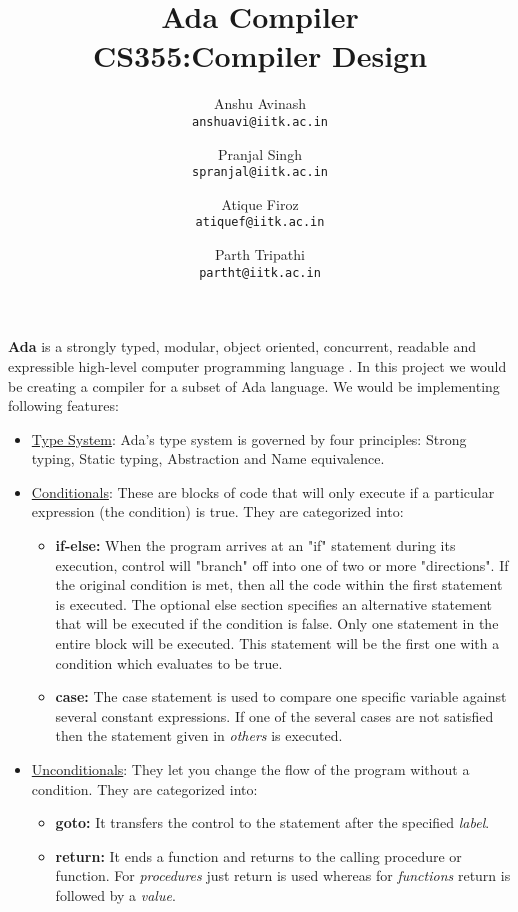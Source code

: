 \documentclass{article}
\title{
Ada Compiler \\
CS355:Compiler Design
}
\author{
Anshu Avinash\\
\texttt{anshuavi@iitk.ac.in}
\and
Pranjal Singh\\
\texttt{spranjal@iitk.ac.in}
\and
Atique Firoz\\
\texttt{atiquef@iitk.ac.in}
\and
Parth Tripathi\\
\texttt{partht@iitk.ac.in}
}
\begin{document}
\maketitle
\textbf{Ada} is a strongly typed, modular, object oriented, concurrent, readable and expressible high-level computer programming language \cite{AdaIC}. In this project we would be creating a compiler for a subset of Ada language. We would be implementing following features:

\begin{itemize}
	\item \uline{Type System}: Ada's type system is governed by four principles: Strong typing, Static typing, Abstraction and Name equivalence.
	\item \uline{Conditionals}: These are blocks of code that will only execute if a particular expression (the condition) is true. They are categorized into:
	\begin{itemize}
		\item \textbf{if-else:} When the program arrives at an "if" statement during its execution, control will "branch" off into one of two or more "directions". If the original condition is met, then all the code within the first statement is executed. The optional else section specifies an alternative statement that will be executed if the condition is false. Only one statement in the entire block will be executed. This statement will be the first one with a
condition which evaluates to be true.
		\item \textbf{case:} The case statement is used to compare one specific variable against several constant expressions. If one of the several cases are not satisfied then the statement given in \emph{others} is executed.		
	\end{itemize}	
	
	\item \uline{Unconditionals}: They let you change the flow of the program without a condition. They are categorized into:
		\begin{itemize}
			\item \textbf{goto:} It transfers the control to the statement after the specified \emph{label}.
			\item \textbf{return:} It ends a function and returns to the calling procedure or function. For \emph{procedures} just return is used whereas for \emph{functions} return is followed by a \emph{value}.
		\end{itemize}
		

\end{itemize}
\end{document}

